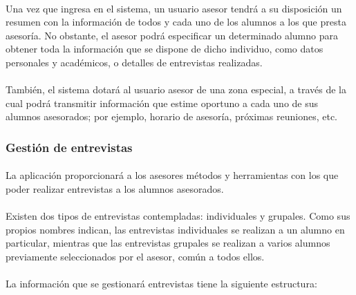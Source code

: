       \paragraph{}Una vez que ingresa en el sistema, un usuario asesor tendrá
      a su disposición un resumen con la información de todos y cada uno de los
      alumnos a los que presta asesoría. No obstante, el asesor podrá
      especificar un determinado alumno para obtener toda la información que
      se dispone de dicho individuo, como datos personales y académicos, o
      detalles de entrevistas realizadas.

      \paragraph{}También, el sistema dotará al usuario asesor de una
      zona especial, a través de la cual podrá transmitir información que estime
      oportuno a cada uno de sus alumnos asesorados; por ejemplo, horario
      de asesoría, próximas reuniones, etc.

      \subsubsection{Gestión de entrevistas}

      \paragraph{}La aplicación proporcionará a los asesores métodos y
      herramientas con los que poder realizar entrevistas a los alumnos
      asesorados.

      \paragraph{}Existen dos tipos de entrevistas contempladas: individuales y
      grupales. Como sus propios nombres indican, las entrevistas individuales
      se realizan a un alumno en particular, mientras que las entrevistas
      grupales se realizan a varios alumnos previamente seleccionados por el
      asesor, común a todos ellos.

      \paragraph{}La información que se gestionará entrevistas tiene la
      siguiente estructura:

